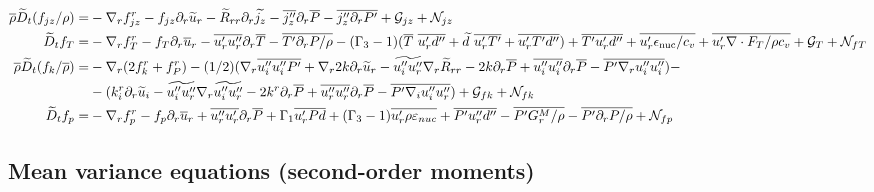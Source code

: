 \documentclass[10pt,paper=a4]{report}
\newcommand{\eht}{\overline}
\newcommand{\fht}{\widetilde}
\newcommand{\fav}{\widetilde}
\def\erho{\eht{\rho}}
\begin{document}
\begin{table}[!h]
\begin{align}
\erho \fav{D}_t (f_{jz} / \rho) = & -\nabla_r f_{jz}^r  - f_{jz} \partial_r \fht{u}_r - \fht{R}_{rr} \partial_r \fht{j_z} -\eht{j''_z} \partial_r \eht{P} - \eht{j''_z \partial_r P'} + {\mathcal G_{jz}} + {\mathcal N_{jz}} \label{eq:rans_fjz} \\
\fht{D}_t f_T = & -\nabla_r f_T^r - f_T \partial_r \eht{u}_r - \eht{u'_r u''_r} \partial_r \eht{T} - \eht{T'\partial_r P / \rho} - (\Gamma_3 -1)(\eht{T} \ \eht{u'_r d''}+\fht{d} \ \eht{u'_r T'} + \eht{u'_r T'd''}) +\eht{T'u'_rd''} + \eht{u'_r \epsilon_{\rm nuc}/c_v} +  \eht{u'_r \nabla \cdot F_T / \rho c_v} + {\mathcal G_{T}} +  {\mathcal N_{fT}} \\
\erho \fav{D}_t (f_k / \eht{\rho}) = &  -\nabla_r ( 2 f_k^r + f_P^r ) - (1/2)(\nabla_r \eht{u''_iu''_iP'} + \nabla_r 2 k \partial_r \fht{u}_r - \fht{u''_iu''_r}\nabla_r \fht{R}_{rr} - 2 k \partial_r \eht{P} + \eht{u''_iu''_i}\partial_r \eht{P} - \eht{P'\nabla_r u''_iu''_i}) - \\
& - (k_i^r\partial_r \fht{u}_i - \fht{u''_iu''_r} \nabla_r \fht{u''_i u''_r} - 2 k^r \partial_r \eht{P} + \eht{u''_r u''_r} \partial_r \eht{P} - \eht{P'\nabla_iu''_iu''_r}) + {\mathcal G_{fk}} + {\mathcal N_{fk}} \\
\fht{D}_t f_p = & -\nabla_r f_p^r - f_p \partial_r \eht{u}_r + \eht{u''_r u'_r}\partial_r \eht{P} + \Gamma_1 \eht{u'_r P d} + (\Gamma_3 -1)\eht{u'_r \rho \varepsilon_{nuc}} + \eht{P'u''_r d''} - \eht{P' G_r^M / \rho} - \eht{P'\partial_r P/ \rho}  + {\mathcal N_{fp}} 
\end{align} 
\end{table}

\subsection{Mean variance equations (second-order moments)}
\end{document}
